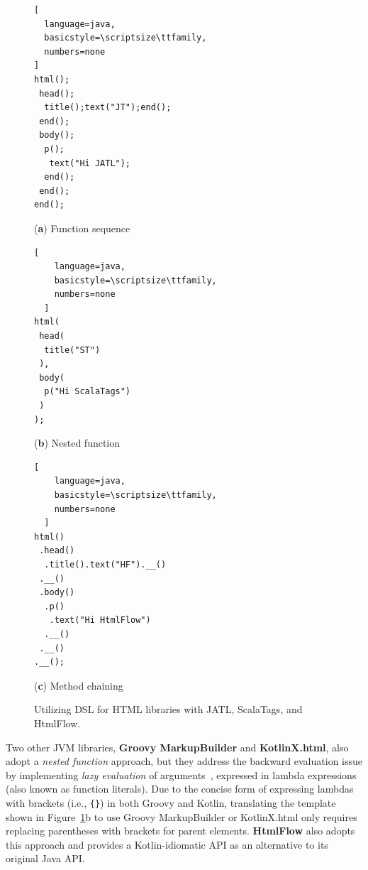 \documentclass[software,article,accept,pdftex,moreauthors]{Definitions/mdpi}
\begin{document}
\begin{figure}[H]
  \centering

\begin{minipage}[c]{0.33\linewidth}
  \centering
  \begin{lstlisting}[
  language=java,
  basicstyle=\scriptsize\ttfamily,
  numbers=none
]
html();
 head();
  title();text("JT");end();
 end();
 body();
  p();
   text("Hi JATL");
  end();
 end();
end();
  \end{lstlisting}
    \caption*{\centering(\textbf{a}) Function sequence}
  \end{minipage}
  \hfil
  \begin{minipage}[c]{0.23\linewidth}
    \centering
    \begin{lstlisting}[
    language=java,
    basicstyle=\scriptsize\ttfamily,
    numbers=none
  ]
html(
 head(
  title("ST")
 ),
 body(
  p("Hi ScalaTags")
 )
);
  \end{lstlisting}
    \caption*{\centering(\textbf{b}) Nested function}
  \end{minipage}
  \hfil
  \begin{minipage}[c]{0.32\linewidth}
    \centering
    \begin{lstlisting}[
    language=java,
    basicstyle=\scriptsize\ttfamily,
    numbers=none
  ]
html()
 .head()
  .title().text("HF").__()
 .__()
 .body()
  .p()
   .text("Hi HtmlFlow")
  .__()
 .__()
.__();
  \end{lstlisting}
    \caption*{\centering(\textbf{c}) Method chaining}
  \end{minipage}
\vspace*{6pt}
  \caption{Utilizing DSL for HTML libraries with JATL, ScalaTags, and HtmlFlow.}
  \label{fig:dsl-idioms}
\end{figure}



Two other JVM libraries, \textbf{Groovy MarkupBuilder} and
\textbf{KotlinX.html}, also adopt a \textit{nested function} approach, but they
address the backward evaluation issue by implementing \textit{lazy evaluation}
of arguments~\cite{Landin65}, expressed in lambda expressions (also known as
function literals). Due to the concise form of expressing lambdas with brackets
(i.e., \texttt{\{\}}) in both Groovy and Kotlin, translating the template shown
in Figure~\ref{fig:dsl-idioms}b to use Groovy MarkupBuilder or KotlinX.html
only requires replacing parentheses with brackets for parent elements.
\textbf{HtmlFlow} also adopts this approach and provides a Kotlin-idiomatic API
as an alternative to its original Java API.
\end{document}
